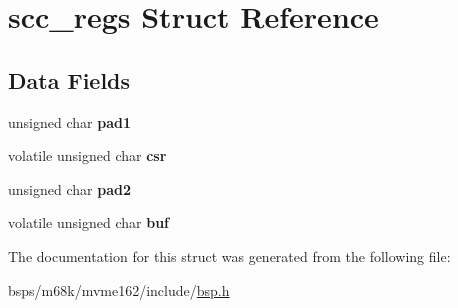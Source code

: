\hypertarget{structscc__regs}{}\section{scc\+\_\+regs Struct Reference}
\label{structscc__regs}
\subsection*{Data Fields}
\begin{DoxyCompactItemize}
\item 
\mbox{\label{structscc__regs_a67d58e951564c076e991675165c0e838}} 
unsigned char {\bfseries pad1}
\item 
\mbox{\label{structscc__regs_aeecf426b002b434d70ce0cfe50c695af}} 
volatile unsigned char {\bfseries csr}
\item 
\mbox{\label{structscc__regs_abd2382123d1c384a786cbd2dd84a11f9}} 
unsigned char {\bfseries pad2}
\item 
\mbox{\label{structscc__regs_ac718a4ecd21a6fd687ff284fb9ee0b16}} 
volatile unsigned char {\bfseries buf}
\end{DoxyCompactItemize}


The documentation for this struct was generated from the following file\+:\begin{DoxyCompactItemize}
\item 
bsps/m68k/mvme162/include/\mbox{\hyperlink{bsps_2m68k_2mvme162_2include_2bsp_8h}{bsp.\+h}}\end{DoxyCompactItemize}
